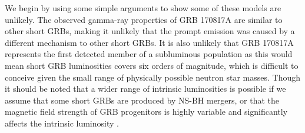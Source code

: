 \documentclass[11pt]{cuthesis}
\begin{document}
We begin by using some simple arguments to show some of these models are unlikely. The observed gamma-ray properties of GRB 170817A are similar to other short GRBs, making it unlikely that the prompt emission was caused by a different mechanism to other short GRBs. It is also unlikely that GRB 170817A represents the first detected member of a subluminous population as this would mean short GRB luminosities covers six orders of magnitude, which is difficult to conceive given the small range of physically possible neutron star masses. Though it should be noted that a wider range of intrinsic luminosities is possible if we assume that some short GRBs are produced by NS-BH mergers, or that the magnetic field strength of GRB progenitors is highly variable and significantly affects the intrinsic luminosity \cite{GW170817_GRB}.
\end{document}
